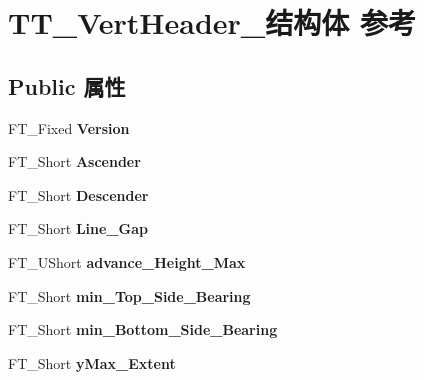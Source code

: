 \hypertarget{struct_t_t___vert_header__}{}\section{T\+T\+\_\+\+Vert\+Header\+\_\+结构体 参考}
\label{struct_t_t___vert_header__}
\subsection*{Public 属性}
\begin{DoxyCompactItemize}
\item 
\mbox{\label{struct_t_t___vert_header___a32d736621b757e9a39a15f2f82d15b9c}} 
F\+T\+\_\+\+Fixed {\bfseries Version}
\item 
\mbox{\label{struct_t_t___vert_header___afa95848b08d1fc8bd6bfe7e639e2895c}} 
F\+T\+\_\+\+Short {\bfseries Ascender}
\item 
\mbox{\label{struct_t_t___vert_header___afeeb8f6c759a76d655f24f1d58f1cf35}} 
F\+T\+\_\+\+Short {\bfseries Descender}
\item 
\mbox{\label{struct_t_t___vert_header___a8a6ad9f251e12e6701ebe53d19a65aa5}} 
F\+T\+\_\+\+Short {\bfseries Line\+\_\+\+Gap}
\item 
\mbox{\label{struct_t_t___vert_header___a7a2acbd1abd4cc4d6f40110203f99d0f}} 
F\+T\+\_\+\+U\+Short {\bfseries advance\+\_\+\+Height\+\_\+\+Max}
\item 
\mbox{\label{struct_t_t___vert_header___a10d78594a56f0966ae1d7b60138fbec2}} 
F\+T\+\_\+\+Short {\bfseries min\+\_\+\+Top\+\_\+\+Side\+\_\+\+Bearing}
\item 
\mbox{\label{struct_t_t___vert_header___a21422639a4cfd8dcdc9ebb3795676292}} 
F\+T\+\_\+\+Short {\bfseries min\+\_\+\+Bottom\+\_\+\+Side\+\_\+\+Bearing}
\item 
\mbox{\label{struct_t_t___vert_header___af6927e95c1dfbe90c2e76b1eef521d53}} 
F\+T\+\_\+\+Short {\bfseries y\+Max\+\_\+\+Extent}

\end{DoxyCompactItemize}
